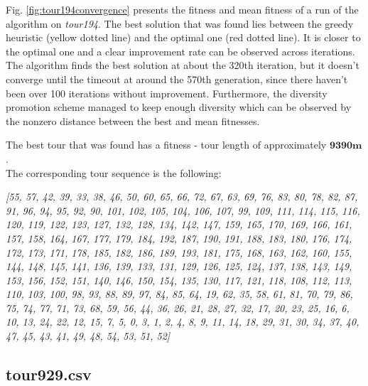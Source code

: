 \documentclass[a4paper,10pt]{article}
\newcommand{\ReplaceMe}[1]{{\color{blue}#1}}
\begin{document}
Fig. \ref{fig:tour194convergence} presents the fitness and mean fitness of a run of the algorithm on \textit{tour194}. The best solution that was found lies between the greedy heuristic (yellow dotted line) and the optimal one (red dotted line). It is closer to the optimal one and a clear improvement rate can be observed across iterations. The algorithm finds the best solution at about the 320th iteration, but it doesn't converge until the timeout at around the 570th generation, since there haven't been over 100 iterations without improvement. Furthermore, the diversity promotion scheme managed to keep enough diversity which can be observed by the nonzero distance between the best and mean fitnesses.

The best tour that was found has a fitness - tour length of approximately $\textbf{9390m}$.\\
The corresponding tour sequence is the following:

\begin{center}
\textit{[55, 57, 42, 39, 33, 38, 46, 50, 60, 65, 66, 72, 67, 63, 69, 76, 83, 80, 78, 82, 87, 91, 96, 94, 95, 92, 90, 101, 102, 105, 104, 106, 107, 99, 109, 111, 114, 115, 116, 120, 119, 122, 123, 127, 132, 128, 134, 142, 147, 159, 165, 170, 169, 166, 161, 157, 158, 164, 167, 177, 179, 184, 192, 187, 190, 191, 188, 183, 180, 176, 174, 172, 173, 171, 178, 185, 182, 186, 189, 193, 181, 175, 168, 163, 162, 160, 155, 144, 148, 145, 141, 136, 139, 133, 131, 129, 126, 125, 124, 137, 138, 143, 149, 153, 156, 152, 151, 140, 146, 150, 154, 135, 130, 117, 121, 118, 108, 112, 113, 110, 103, 100, 98, 93, 88, 89, 97, 84, 85, 64, 19, 62, 35, 58, 61, 81, 70, 79, 86, 75, 74, 77, 71, 73, 68, 59, 56, 44, 36, 26, 21, 28, 27, 32, 17, 20, 23, 25, 16, 6, 10, 13, 24, 22, 12, 15, 7, 5, 0, 3, 1, 2, 4, 8, 9, 11, 14, 18, 29, 31, 30, 34, 37, 40, 47, 45, 43, 41, 49, 48, 54, 53, 51, 52]}
\end{center}

\subsection{tour929.csv} \label{ss:tour929}

%
%
%
\end{document}
